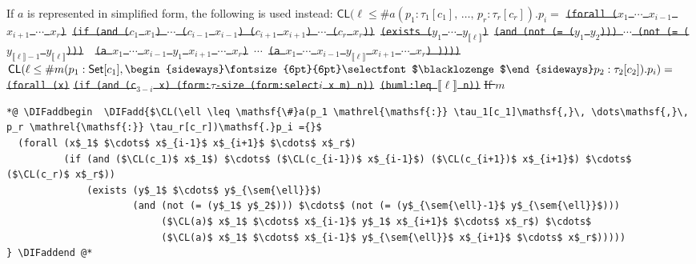 \documentclass[10pt,fleqn,final]{scrreprt}
\newcommand*{\CL}{\ensuremath{\mathsf{CL}}\xspace}
\newenvironment{definitions}[0]{\medskip }{}
\newcommand{\composition}{\raisebox{0.2pt}{\begin{sideways}\fontsize{6pt}{6pt}\selectfont$\blacklozenge$\end{sideways}}}
\newcommand{\sem}[1]{\mathopen\llbracket#1\mathclose\rrbracket}
\newcommand{\white}[1]{{\color{white}{#1}}}
\newcommand{\qqquad}{\white{x}\qquad}
\providecommand{\DIFadd}[1]{{\protect\color{blue}\uwave{#1}}} %
\providecommand{\DIFdel}[1]{{\protect\color{red}\sout{#1}}}                      %
\providecommand{\DIFaddbegin}{} %
\providecommand{\DIFaddend}{} %
\providecommand{\DIFdelbegin}{} %
\providecommand{\DIFdelend}{} %
\begin{document}
\begin{definitions}
\noindent If $a$ is represented in simplified form, the following is used instead:
\DIFdelbegin %
\DIFdel{$\CL(\ell \leq \mathsf{\#}a(p_1 \mathrel{\mathsf{:}} \tau_1[c_1]\mathsf{,}\, \dots\mathsf{,}\, p_r \mathrel{\mathsf{:}} \tau_r[c_r])\mathsf{.}p_i=$}%
\texttt{\DIFdel{(forall ($x_1$ $\cdots$ $x_{i-1}$ $x_{i+1}$ $\cdots$ $x_r$)}%
\DIFdel{(if (and ($c_1$ $x_1$) $\cdots$ ($c_{i-1}$ $x_{i-1}$) ($c_{i+1}$ $x_{i+1}$) $\cdots$ ($c_r$ $x_r$))}%
\DIFdel{(exists ($y_1$ $\cdots$ $y_{\sem{\ell}}$)}%
\DIFdel{(and (not (= ($y_1$ $y_2$))) $\cdots$  (not (= ($y_{\sem{\ell}-1}$ $y_{\sem{\ell}}$))) }%
\DIFdel{(a $x_1$ $\cdots$ $x_{i-1}$ $y_1$ $x_{i+1}$ $\cdots$ $x_r$)}%
\DIFdel{$\cdots$}%
\DIFdel{(a $x_1$ $\cdots$ $x_{i-1}$ $y_{\sem{\ell}}$ $x_{i+1}$ $\cdots$ $x_r$) ))))}}
\DIFdel{$\CL(\ell \leq \mathsf{\#}m(p_1 \mathrel{\mathsf{:}} \mathsf{Set}[c_1]\mathsf{,}\, \composition p_2 \mathrel{\mathsf{:}} \tau_2[c_2])\mathsf{.}p_i)=$}%
\texttt{\DIFdel{(forall (x)}}%
\texttt{\DIFdel{(if (and (c$_{3-i}$ x) (form:$\tau$-size (form:select$i$ x m) n))}%
\DIFdel{(buml:leq $\sem{\ell}$ n))}}%
\DIFdel{If $m$ }\DIFdelend 
{}
\begin{lstlisting}[language=clif, mathescape]
*@ \DIFaddbegin  \DIFadd{$\CL(\ell \leq \mathsf{\#}a(p_1 \mathrel{\mathsf{:}} \tau_1[c_1]\mathsf{,}\, \dots\mathsf{,}\, p_r \mathrel{\mathsf{:}} \tau_r[c_r])\mathsf{.}p_i ={}$
  (forall (x$_1$ $\cdots$ x$_{i-1}$ x$_{i+1}$ $\cdots$ x$_r$)
          (if (and ($\CL(c_1)$ x$_1$) $\cdots$ ($\CL(c_{i-1})$ x$_{i-1}$) ($\CL(c_{i+1})$ x$_{i+1}$) $\cdots$ ($\CL(c_r)$ x$_r$))
              (exists (y$_1$ $\cdots$ y$_{\sem{\ell}}$)
                      (and (not (= (y$_1$ y$_2$))) $\cdots$ (not (= (y$_{\sem{\ell}-1}$ y$_{\sem{\ell}}$)))
                           ($\CL(a)$ x$_1$ $\cdots$ x$_{i-1}$ y$_1$ x$_{i+1}$ $\cdots$ x$_r$) $\cdots$
                           ($\CL(a)$ x$_1$ $\cdots$ x$_{i-1}$ y$_{\sem{\ell}}$ x$_{i+1}$ $\cdots$ x$_r$)))))
} \DIFaddend @*
\end{lstlisting}


\end{definitions}
\end{document}
